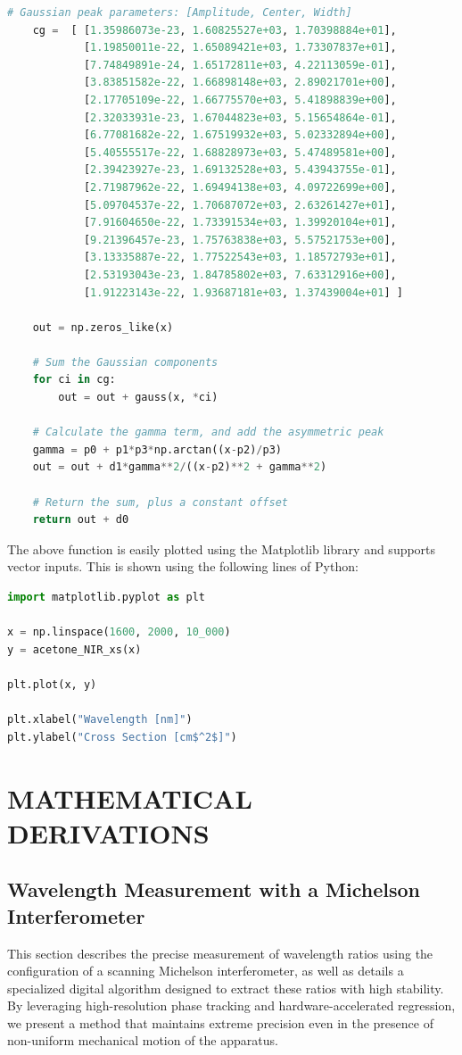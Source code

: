 \begin{lstlisting}[language=Python, basicstyle=\ttfamily\footnotesize]
    # Gaussian peak parameters: [Amplitude, Center, Width]
    cg =  [ [1.35986073e-23, 1.60825527e+03, 1.70398884e+01],
            [1.19850011e-22, 1.65089421e+03, 1.73307837e+01],
            [7.74849891e-24, 1.65172811e+03, 4.22113059e-01],
            [3.83851582e-22, 1.66898148e+03, 2.89021701e+00],
            [2.17705109e-22, 1.66775570e+03, 5.41898839e+00],
            [2.32033931e-23, 1.67044823e+03, 5.15654864e-01],
            [6.77081682e-22, 1.67519932e+03, 5.02332894e+00],
            [5.40555517e-22, 1.68828973e+03, 5.47489581e+00],
            [2.39423927e-23, 1.69132528e+03, 5.43943755e-01],
            [2.71987962e-22, 1.69494138e+03, 4.09722699e+00],
            [5.09704537e-22, 1.70687072e+03, 2.63261427e+01],
            [7.91604650e-22, 1.73391534e+03, 1.39920104e+01],
            [9.21396457e-23, 1.75763838e+03, 5.57521753e+00],
            [3.13335887e-22, 1.77522543e+03, 1.18572793e+01],
            [2.53193043e-23, 1.84785802e+03, 7.63312916e+00],
            [1.91223143e-22, 1.93687181e+03, 1.37439004e+01] ]

    out = np.zeros_like(x)

    # Sum the Gaussian components
    for ci in cg:
        out = out + gauss(x, *ci)
    
    # Calculate the gamma term, and add the asymmetric peak
    gamma = p0 + p1*p3*np.arctan((x-p2)/p3)
    out = out + d1*gamma**2/((x-p2)**2 + gamma**2)
    
    # Return the sum, plus a constant offset
    return out + d0
\end{lstlisting}
The above function is easily plotted using the Matplotlib library and supports vector inputs. This is shown using the following lines of Python:
\begin{lstlisting}[language=Python, basicstyle=\ttfamily\footnotesize]
import matplotlib.pyplot as plt

x = np.linspace(1600, 2000, 10_000)
y = acetone_NIR_xs(x)

plt.plot(x, y)

plt.xlabel("Wavelength [nm]")
plt.ylabel("Cross Section [cm$^2$]")
\end{lstlisting}


\chapter{MATHEMATICAL DERIVATIONS}

\section{Wavelength Measurement with a Michelson Interferometer} \label{sec:wl_wavelength}
This section describes the precise measurement of wavelength ratios using the configuration of a scanning Michelson interferometer, as well as details a specialized digital algorithm designed to extract these ratios with high stability. By leveraging high-resolution phase tracking and hardware-accelerated regression, we present a method that maintains extreme precision even in the presence of non-uniform mechanical motion of the apparatus.

